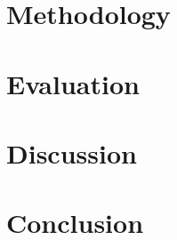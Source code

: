 \documentclass[conference]{IEEEtran}
\begin{document}
\section{Methodology}
\label{sec:method}


\section{Evaluation}
\label{sec:eval}


\section{Discussion}
\label{sec:discussion}


\section{Conclusion}
\label{sec:conclusion}





\end{document}
